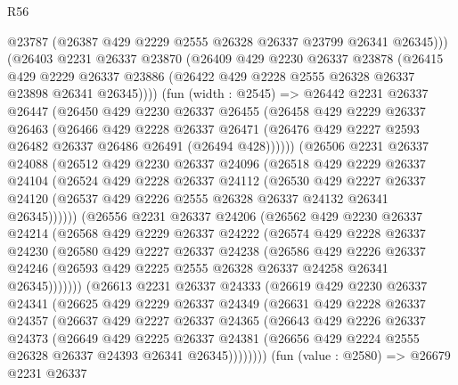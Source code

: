 \begin{lexlean}{R56}
\begin{coremodule}
        @23787
        (@26387 @429 @2229 @2555 @26328 @26337 @23799 @26341 @26345)))
    (@26403
      @2231
      @26337
      @23870
      (@26409
        @429
        @2230
        @26337
        @23878
        (@26415
          @429
          @2229
          @26337
          @23886
          (@26422 @429 @2228 @2555 @26328 @26337 @23898 @26341 @26345))))
    (fun (width : @2545) =>
    @26442
      @2231
      @26337
      @26447
      (@26450
        @429
        @2230
        @26337
        @26455
        (@26458
          @429
          @2229
          @26337
          @26463
          (@26466
            @429
            @2228
            @26337
            @26471
            (@26476 @429 @2227 @2593 @26482 @26337 @26486 @26491 (@26494 @428))))))
    (@26506
      @2231
      @26337
      @24088
      (@26512
        @429
        @2230
        @26337
        @24096
        (@26518
          @429
          @2229
          @26337
          @24104
          (@26524
            @429
            @2228
            @26337
            @24112
            (@26530
              @429
              @2227
              @26337
              @24120
              (@26537 @429 @2226 @2555 @26328 @26337 @24132 @26341 @26345))))))
    (@26556
      @2231
      @26337
      @24206
      (@26562
        @429
        @2230
        @26337
        @24214
        (@26568
          @429
          @2229
          @26337
          @24222
          (@26574
            @429
            @2228
            @26337
            @24230
            (@26580
              @429
              @2227
              @26337
              @24238
              (@26586
                @429
                @2226
                @26337
                @24246
                (@26593 @429 @2225 @2555 @26328 @26337 @24258 @26341 @26345)))))))
    (@26613
      @2231
      @26337
      @24333
      (@26619
        @429
        @2230
        @26337
        @24341
        (@26625
          @429
          @2229
          @26337
          @24349
          (@26631
            @429
            @2228
            @26337
            @24357
            (@26637
              @429
              @2227
              @26337
              @24365
              (@26643
                @429
                @2226
                @26337
                @24373
                (@26649
                  @429
                  @2225
                  @26337
                  @24381
                  (@26656 @429 @2224 @2555 @26328 @26337 @24393 @26341 @26345))))))))
    (fun (value : @2580) =>
    @26679
      @2231
      @26337

\end{coremodule}
\end{lexlean}
